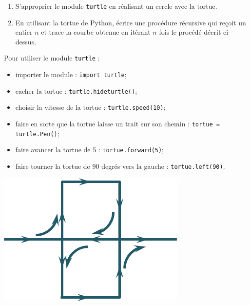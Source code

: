 \documentclass[10pt,fleqn]{article} %
\begin{document}
\begin{multicols}{2}
\begin{enumerate}
\item S'approprier le module \texttt{turtle} en réalisant un cercle avec la tortue.
\item En utilisant la tortue de Python, écrire une procédure récursive qui reçoit un entier $n$ et trace la courbe obtenue en itérant $n$ fois le procédé décrit ci-dessus.
\end{enumerate}
\begin{rem}
Pour utiliser le module \texttt{turtle} :
\begin{itemize}
\item importer le module : \texttt{import turtle};
\item cacher la tortue : \texttt{turtle.hideturtle()};
\item choisir la vitesse de la tortue : \texttt{turtle.speed(10)};
\item faire en sorte que la tortue laisse un trait sur son chemin : \texttt{tortue = turtle.Pen()};
\item faire avancer la tortue de 5 : \texttt{tortue.forward(5)};
\item faire tourner la tortue de 90 degrés vers la gauche : \texttt{tortue.left(90)}.
\end{itemize}
\end{rem}

\begin{center}
\includegraphics[width=.55\linewidth]{images/peano}
\end{center}


\end{multicols}
\end{document}
